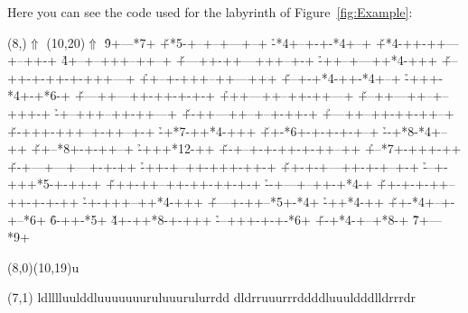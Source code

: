\documentclass[a4paper,11pt,headinclude,footinclude]{scrartcl}
\def\ins{~}
\begin{document}
Here you can see the code used for the labyrinth of Figure\ins\ref{fig:Example}:
\label{sec:Example}
\begin{code}
\begin{labyrinth}[unit=9pt]{19}{20}
\putsymbol(8,){\Large$\Uparrow$}
\putsymbol(10,20){\Large$\Uparrow$}
                        \h *9+---*7+
\v +*5-+--+--+---+--+   \h -*4+--+-+-*4+--+ 
\v +*4-++-++---+--++-+  \h *4+--+--+++--++--+ 
\v +---++-++---+++--+-+ \h -++--+---++*4-+++ 
\v +--++-+-++-+-+++---+ \h ++--+-+++--++---+++ 
\v +--+-+*4-++-*4+--+   \h -+++-*4+-+*6-+ 
\v +---++---++-++-+-+-+ \h +++---++--++-++---+ 
\v +--++---++--+--+++-+ \h -+--+++--++-++---+ 
\v +-++---++--+--+-++-+ \h +---++--++-++-++--+ 
\v +-+++-+++--+-++--+-+ \h -+*7-++*4-+++ 
\v ++-*6+-+-+-+-+--+    \h --+*8-*4+--++ 
\v ++--*8+-+-++--+      \h -+++*{12}-++ 
\v +-+--+-+-++-+-++--++ \h +--*7+-+++-++ 
\v +-+---+---+---+-+-++ \h -++-+--++-+++-++-+ 
\v ++-+-+---++-+-+--+-+ \h ---+-+++*5-+-++-+ 
\v +++-++--++-++-++-+-+ \h --+---+--++-+*4-+ 
\v ++-+-+-++--++-+-+-++ \h -+-+++--++*4-+++ 
\v +---+-++--*5+-*4+    \h -++*4-++ 
\v ++-*4+--+-+--*6+     \h *6-++-*5+ 
\v *4+-++*8-+-+++       \h ---+++-+-+-*6+ 
\v +-+*4-+--+*8-+       \h *7+---*9+

\autosolution[font=\color{Orange}](8,0)(10,19){u}

\labyrinthsolution[
	font=\color{MidnightBlue}\footnotesize,
	up=\kern2pt$\uparrow$,
	left=$\leftarrow$,
	down=\kern2pt$\downarrow$,
	right=$\rightarrow$,
	hcorr=0.1\unitlength,
	vcorr=0.3\unitlength](7,1){%
	ldlllluulddluuuuuuuruluuurulurrdd%
	dldrruuurrrddddluuuldddlldrrrdr}
\end{labyrinth}
\end{code}


\printindex
\end{document}
